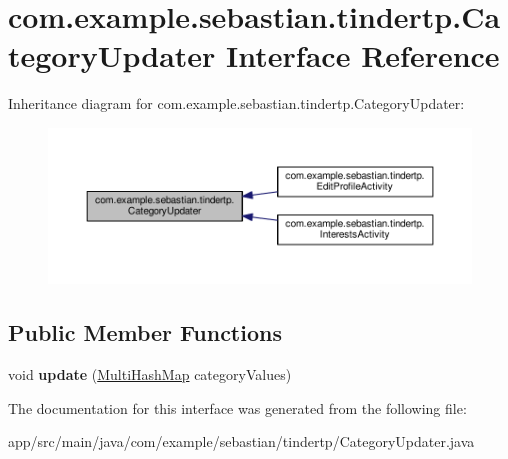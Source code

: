 \hypertarget{interfacecom_1_1example_1_1sebastian_1_1tindertp_1_1CategoryUpdater}{}\section{com.\+example.\+sebastian.\+tindertp.\+Category\+Updater Interface Reference}
\label{interfacecom_1_1example_1_1sebastian_1_1tindertp_1_1CategoryUpdater}


Inheritance diagram for com.\+example.\+sebastian.\+tindertp.\+Category\+Updater\+:\nopagebreak
\begin{figure}[H]
\begin{center}
\leavevmode
\includegraphics[width=350pt]{interfacecom_1_1example_1_1sebastian_1_1tindertp_1_1CategoryUpdater__inherit__graph}
\end{center}
\end{figure}
\subsection*{Public Member Functions}
\begin{DoxyCompactItemize}
\item 
void {\bfseries update} (\hyperlink{classcom_1_1example_1_1sebastian_1_1tindertp_1_1commonTools_1_1MultiHashMap}{Multi\+Hash\+Map} category\+Values)\hypertarget{interfacecom_1_1example_1_1sebastian_1_1tindertp_1_1CategoryUpdater_a14dd4be3c42dd5c27c311ee2c69c8b75}{}\label{interfacecom_1_1example_1_1sebastian_1_1tindertp_1_1CategoryUpdater_a14dd4be3c42dd5c27c311ee2c69c8b75}

\end{DoxyCompactItemize}


The documentation for this interface was generated from the following file\+:\begin{DoxyCompactItemize}
\item 
app/src/main/java/com/example/sebastian/tindertp/Category\+Updater.\+java\end{DoxyCompactItemize}

